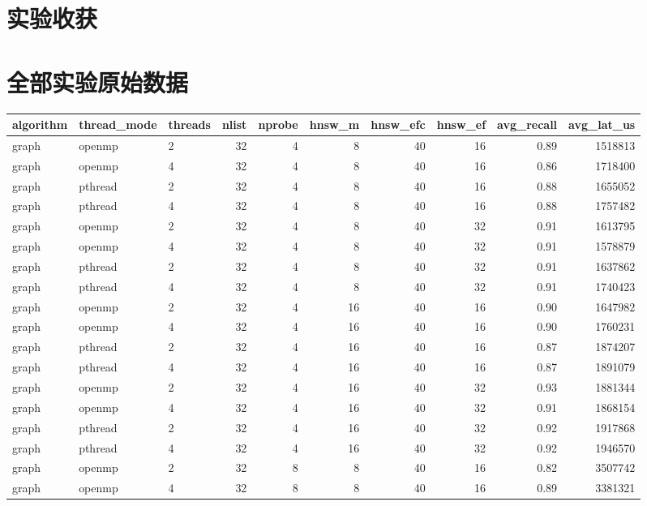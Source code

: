 \documentclass[a4paper]{article}
\begin{document}
\section{实验收获}



\appendix
\section{全部实验原始数据}

{\scriptsize
\begin{longtable}{lllrrrrrrr}
\toprule
algorithm & thread\_mode & threads & nlist & nprobe & hnsw\_m & hnsw\_efc & hnsw\_ef & avg\_recall & avg\_lat\_us \\
\midrule
\endhead
graph & openmp & 2 & 32 & 4 & 8 & 40 & 16 & 0.89 & 1518813 \\
graph & openmp & 4 & 32 & 4 & 8 & 40 & 16 & 0.86 & 1718400 \\
graph & pthread & 2 & 32 & 4 & 8 & 40 & 16 & 0.88 & 1655052 \\
graph & pthread & 4 & 32 & 4 & 8 & 40 & 16 & 0.88 & 1757482 \\
graph & openmp & 2 & 32 & 4 & 8 & 40 & 32 & 0.91 & 1613795 \\
graph & openmp & 4 & 32 & 4 & 8 & 40 & 32 & 0.91 & 1578879 \\
graph & pthread & 2 & 32 & 4 & 8 & 40 & 32 & 0.91 & 1637862 \\
graph & pthread & 4 & 32 & 4 & 8 & 40 & 32 & 0.91 & 1740423 \\
graph & openmp & 2 & 32 & 4 & 16 & 40 & 16 & 0.90 & 1647982 \\
graph & openmp & 4 & 32 & 4 & 16 & 40 & 16 & 0.90 & 1760231 \\
graph & pthread & 2 & 32 & 4 & 16 & 40 & 16 & 0.87 & 1874207 \\
graph & pthread & 4 & 32 & 4 & 16 & 40 & 16 & 0.87 & 1891079 \\
graph & openmp & 2 & 32 & 4 & 16 & 40 & 32 & 0.93 & 1881344 \\
graph & openmp & 4 & 32 & 4 & 16 & 40 & 32 & 0.91 & 1868154 \\
graph & pthread & 2 & 32 & 4 & 16 & 40 & 32 & 0.92 & 1917868 \\
graph & pthread & 4 & 32 & 4 & 16 & 40 & 32 & 0.92 & 1946570 \\
graph & openmp & 2 & 32 & 8 & 8 & 40 & 16 & 0.82 & 3507742 \\
graph & openmp & 4 & 32 & 8 & 8 & 40 & 16 & 0.89 & 3381321 \\

\end{longtable}}
\end{document}
